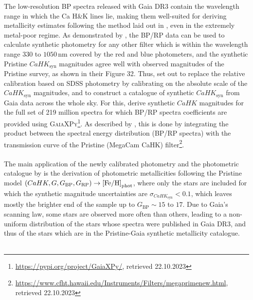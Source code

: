 \documentclass[a4paper,11pt]{article}
\begin{document}
The low-resolution BP spectra released with Gaia DR3 contain the wavelength range in which the Ca H\&K lines lie, making them well-suited for deriving metallicity estimates following the method laid out in \citet{pristine}, even in the extremely metal-poor regime. As demonstrated by \citet{montegriffo23}, the BP/RP data can be used to calculate synthetic photometry for any other filter which is within the wavelength range $330$ to $1050$\,nm covered by the red and blue photometers, and the synthetic Pristine $CaHK_\mathrm{syn}$ magnitudes agree well with observed magnitudes of the Pristine survey, as shown in their Figure 32. Thus, \citet{pristinegaia} set out to replace the relative calibration based on SDSS photometry by calibrating on the absolute scale of the $CaHK_\mathrm{syn}$ magnitudes, and to construct a catalogue of synthetic $CaHK_\mathrm{syn}$ from Gaia data across the whole sky. For this, \citet{pristinegaia} derive synthetic $CaHK$ magnitudes for the full set of 219 million spectra for which BP/RP spectra coefficients are provided using \textsc{GaiaXPy}\footnote{\url{https://pypi.org/project/GaiaXPy/}, retrieved 22.10.2023}. As described by \citet{montegriffo23}, this is done by integrating the product between the spectral energy distribution (BP/RP spectra) with the transmission curve of the Pristine (MegaCam CaHK) filter\footnote{\url{https://www.cfht.hawaii.edu/Instruments/Filters/megaprimenew.html}, retrieved 22.10.2023}.\\ \\
%
The main application of the newly calibrated photometry and the photometric catalogue by \citet{pristinegaia} is the derivation of photometric metallicities following the Pristine model $(CaHK,G,G_\mathrm{BP},G_\mathrm{RP})\\ \rightarrow\mathrm{[Fe/H]}_\mathrm{phot}$, where only the stars are included for which the synthetic magnitude uncertainties are $\sigma_{CaHK_\mathrm{syn}}<0.1$, which leaves mostly the brighter end of the sample up to $G_\mathrm{BP}\sim15$ to $17$. Due to Gaia's scanning law, some stars are observed more often than others, leading to a non-uniform distribution of the stars whose spectra were published in Gaia DR3, and thus of the stars which are in the Pristine-Gaia synthetic metallicity catalogue.\\ \\
%
\end{document}
